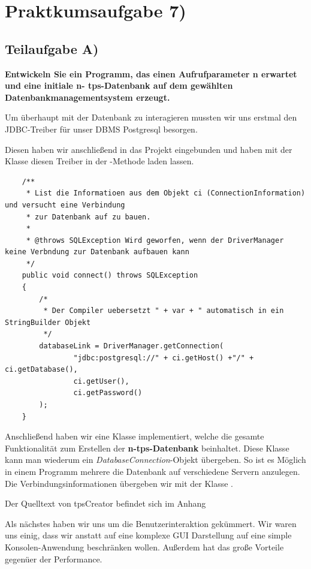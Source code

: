 \section{Praktkumsaufgabe 7)}
\subsection{Teilaufgabe A)}
\textbf{Entwickeln Sie ein Programm, das einen Aufrufparameter n erwartet und eine initiale n-
tps-Datenbank auf dem gewählten Datenbankmanagementsystem erzeugt.}

Um überhaupt mit der Datenbank zu interagieren mussten wir uns erstmal den
JDBC-Treiber für unser DBMS Postgresql besorgen.

Diesen haben wir anschließend in das Projekt eingebunden und haben mit der
Klasse  diesen Treiber in der
-Methode laden lassen.


\begin{lstlisting}
	/**
	 * List die Informatioen aus dem Objekt ci (ConnectionInformation) und versucht eine Verbindung 
	 * zur Datenbank auf zu bauen.
	 * 
	 * @throws SQLException Wird geworfen, wenn der DriverManager keine Verbndung zur Datenbank aufbauen kann
	 */
	public void connect() throws SQLException
	{
		/*
		 * Der Compiler uebersetzt " + var + " automatisch in ein StringBuilder Objekt
		 */
		databaseLink = DriverManager.getConnection(
				"jdbc:postgresql://" + ci.getHost() +"/" + ci.getDatabase(),
				ci.getUser(), 
				ci.getPassword()
		);
	}
\end{lstlisting}


Anschließend haben wir eine Klasse  implementiert, welche die
gesamte Funktionalität zum Erstellen der \textbf{n-tps-Datenbank} beinhaltet.
Diese Klasse kann man wiederum ein \textit{DatabaseConnection}-Objekt übergeben.
So ist es Möglich in einem Programm mehrere die Datenbank auf verschiedene
Servern anzulegen. Die Verbindungsinformationen übergeben wir mit der Klasse
.

Der Quelltext von tpsCreator befindet sich im Anhang~

Als nächstes haben wir uns um die Benutzerinteraktion gekümmert. Wir waren uns
einig, dass wir anstatt auf eine komplexe GUI Darstellung auf eine simple
Konsolen-Anwendung beschränken wollen. Außerdem hat das große Vorteile gegenüer
der Performance.

